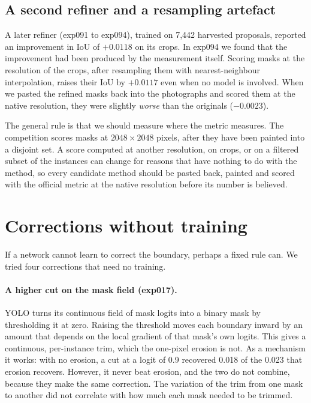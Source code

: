 \subsection{A second refiner and a resampling artefact}\label{sec:post-v2}
A later refiner (exp091 to exp094), trained on 7,442 harvested proposals, reported an improvement
in IoU of $+0.0118$ on its crops. In exp094 we found that the improvement had been produced by the
measurement itself. Scoring masks at the resolution of the crops, after resampling
them with nearest-neighbour interpolation, raises their IoU by $+0.0117$ even when no model is
involved. When we pasted the refined masks back into the photographs and scored them at the native
resolution, they were slightly \emph{worse} than the originals ($-0.0023$).

The general rule is that we should measure where the metric measures. The competition scores masks
at $2048\times2048$ pixels, after they have been painted into a disjoint set. A score computed at
another resolution, on crops, or on a filtered subset of the instances can change for reasons that
have nothing to do with the method, so every candidate method should be pasted back, painted and
scored with the official metric at the native resolution before its number is believed.

\section{Corrections without training}\label{sec:post-free}
If a network cannot learn to correct the boundary, perhaps a fixed rule can. We tried four
corrections that need no training.

\paragraph{A higher cut on the mask field (exp017).} YOLO turns its continuous field of mask logits
into a binary mask by thresholding it at zero. Raising the threshold moves each boundary inward by an
amount that depends on the local gradient of that mask's own logits. This gives a continuous,
per-instance trim, which the one-pixel erosion is not. As a mechanism it works: with no erosion, a
cut at a logit of 0.9 recovered 0.018 of the 0.023 that erosion recovers. However, it never beat
erosion, and the two do not combine, because they make the same correction. The variation of the
trim from one mask to another did not correlate with how much each mask needed to be trimmed.

